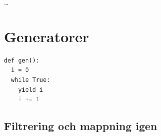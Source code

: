 \begin{frame}[fragile]
  \begin{example}
    
  \end{example}
\end{frame}

\begin{frame}[fragile]
  \begin{example}
    
    \dots
    
  \end{example}
\end{frame}


\section{Generatorer}

\begin{frame}[fragile]
  \begin{lstlisting}[basicstyle=\huge,numbers=none]
def gen():
  i = 0
  while True:
    yield i
    i += 1
  \end{lstlisting}
\end{frame}

\subsection{Filtrering och mappning igen}

\begin{frame}[fragile]
  \begin{example}
    
  \end{example}

  \pause

  \begin{example}
    
  \end{example}
\end{frame}

\begin{frame}[fragile]
  \begin{example}
    
  \end{example}

  \pause

  \begin{example}
    
  \end{example}
\end{frame}

